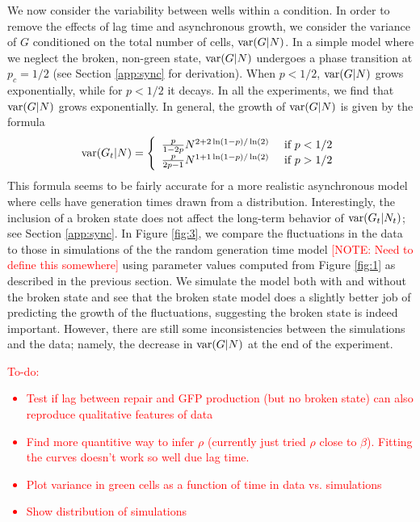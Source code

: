 \documentclass{article}
\begin{document}
We now consider the variability between wells within a condition. In order to remove the effects of lag time and asynchronous  growth, we consider the variance  of $G$ conditioned on the total number of cells, ${\rm var}(G|N)$. In a simple model where we neglect the broken, non-green state, ${\rm var}(G|N)$ undergoes a phase transition at $p_c = 1/2$ (see Section \ref{app:sync} for derivation). When $p<1/2$, ${\rm var}(G|N)$ grows exponentially, while for $p<1/2$ it decays. In all the experiments, we find that ${\rm var}(G|N)$ grows exponentially. In general, the growth of ${\rm var}(G|N)$ is given by the formula 
\begin{equation}
{\rm var}(G_t|N) = \left\{\begin{array}{cc} 
\frac{p}{1-2p} N^{2 + 2 \ln(1-p)/\ln(2)}& \text{ if } p<1/2\\
\frac{p}{2p-1} N^{1+ 1 \ln(1-p)/\ln(2)}& \text{ if } p>1/2
\end{array}\right.
\end{equation}
This formula seems to be fairly accurate for a more realistic asynchronous model where cells have generation times drawn from a distribution.  Interestingly, the inclusion of a broken state does not affect the long-term behavior of ${\rm var}(G_t|N_t)$; see Section \ref{app:sync}. In Figure \ref{fig:3}, we compare the fluctuations in the data to those in simulations of the the random generation time model  \textcolor{red}{[NOTE: Need to define this somewhere]} using parameter values computed from Figure \ref{fig:1} as described in the previous section. We simulate the model both with and without the broken state and see that the broken state model does a slightly better job of predicting the growth of the fluctuations, suggesting the broken state is indeed important. However, there are still some inconsistencies between the simulations and the data; namely, the decrease in ${\rm var}(G|N)$ at the end of the experiment.  


\textcolor{red}{To-do: 
\begin{itemize}
\item Test if lag between repair and GFP production (but no broken state) can also reproduce qualitative features of data
\item Find more quantitive way to infer $\rho$ (currently just tried $\rho$ close to $\beta$). Fitting the curves doesn't work so well due lag time. 
\item Plot variance in green cells as a function of time in data vs. simulations
\item Show distribution of simulations
\end{itemize}
}
\end{document}
